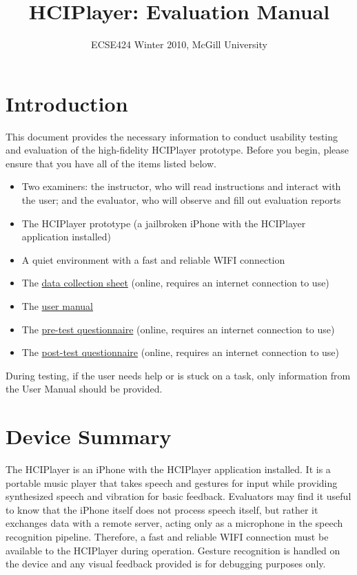 \documentclass[12pt,letterpaper]{article}
\begin{document}
\title{HCIPlayer: Evaluation Manual}
\author{ECSE424 Winter 2010, McGill University}
\renewcommand{\today}{Updated: Monday, March 8th, 2010}
\maketitle

\section{Introduction}

This document provides the necessary information to conduct usability testing and evaluation of the high-fidelity HCIPlayer prototype. Before you begin, please ensure that you have all of the items listed below.

\begin{itemize}
\item Two examiners: the instructor, who will read instructions and interact with the user; and the evaluator, who will observe and fill out evaluation reports
\item The HCIPlayer prototype (a jailbroken iPhone with the HCIPlayer application installed)
\item A quiet environment with a fast and reliable WIFI connection
\item The \href{http://fluidsurveys.com/s/hciplayer-datacollectionsheet/}{data collection sheet} (online, requires an internet connection to use)
\item The \href{http://www.ece.mcgill.ca/~scormi3/hci/docs/user-manual.pdf}{user manual}
\item The \href{http://fluidsurveys.com/s/hciplayer-pretest/}{pre-test questionnaire} (online, requires an internet connection to use)
\item The \href{http://fluidsurveys.com/s/hciplayer-posttest/}{post-test questionnaire} (online, requires an internet connection to use)
\end{itemize}

During testing, if the user needs help or is stuck on a task, only information from the User Manual should be provided.

\section{Device Summary}

The HCIPlayer is an iPhone with the HCIPlayer application installed. It is a portable music player that takes speech and gestures for input while providing synthesized speech and vibration for basic feedback. Evaluators may find it useful to know that the iPhone itself does not process speech itself, but rather it exchanges data with a remote server, acting only as a microphone in the speech recognition pipeline. Therefore, a fast and reliable WIFI connection must be available to the HCIPlayer during operation. Gesture recognition is handled on the device and any visual feedback provided is for debugging purposes only. 
\end{document}
